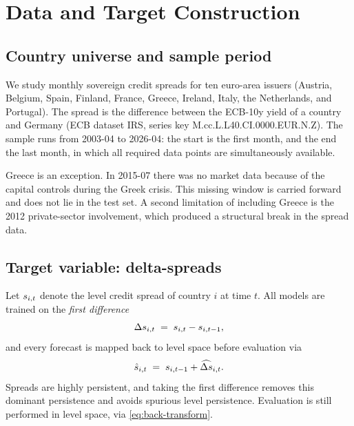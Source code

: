 \section{Data and Target Construction}
\label{sec:data}


\subsection{Country universe and sample period}
\label{sec:data:universe}

We study monthly sovereign credit spreads for ten euro-area issuers
(Austria, Belgium, Spain, Finland, France, Greece, Ireland, Italy, the
Netherlands, and Portugal). The spread is the difference between the ECB-10y yield of a country and Germany (ECB dataset IRS, series key M.{cc}.L.L40.CI.0000.EUR.N.Z). The sample runs from 2003-04
to 2026-04: the start is the first month, and the end the last month, in which
all required data points are simultaneously available.

Greece is an exception. In 2015-07 there was no market data because of the
capital controls during the Greek crisis. This missing window is carried forward and does not lie in the test set. A second limitation of including Greece is the 2012 private-sector
involvement, which produced a structural break in the spread data.

\subsection{Target variable: delta-spreads}
\label{sec:data:target}

Let $s_{i,t}$ denote the level credit spread of country $i$ at time
$t$. All models are trained on the \emph{first difference}
\begin{equation}
  \Delta s_{i,t} \;=\; s_{i,t} - s_{i,t-1},
  \label{eq:delta-target}
\end{equation}
and every forecast is mapped back to level space before evaluation via
\begin{equation}
  \hat{s}_{i,t} \;=\; s_{i,t-1} + \widehat{\Delta s}_{i,t}.
  \label{eq:back-transform}
\end{equation}
Spreads are highly persistent, and taking the first difference removes this
dominant persistence and avoids spurious level persistence. Evaluation is still
performed in level space, via \cref{eq:back-transform}.


